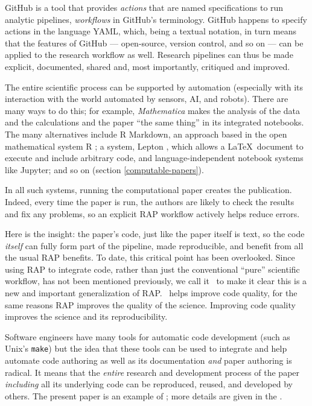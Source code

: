 \documentclass{comjnl}
\begin{document}
GitHub is a tool that provides \emph{actions\/} that are named specifications to run analytic pipelines, \emph{workflows\/} in GitHub's terminology. GitHub happens to specify actions in the language YAML, which, being a textual notation, in turn means that the features of GitHub --- open-source, version control, and so on --- can be applied to the research workflow as well. Research pipelines can thus be made explicit, documented, shared and, most importantly, critiqued and improved.

The entire scientific process can be supported by automation (especially with its interaction with the world automated by sensors, AI, and robots). There are many ways to do this; for example, \emph{Mathematica\/} makes the analysis of the data and the calculations and the paper ``the same thing'' in its integrated notebooks. The many alternatives include R Markdown, an approach based in the open mathematical system R \cite{RMarkdown}; a system, Lepton \cite{lepton}, which allows a \LaTeX\ document to execute and include arbitrary code, and language-independent notebook systems like Jupyter; and so on (section \ref{computable-papers}).  

In all such systems, running the computational paper creates the publication. Indeed, every time the paper is run, the authors are likely to check the results and fix any problems, so an explicit RAP workflow actively helps reduce errors. 

Here is the insight: the paper's code, just like the paper itself is text, so the code \emph{itself\/} can fully form part of the pipeline, made reproducible, and benefit from all the usual RAP benefits. To date, this critical point has been overlooked. Since using RAP to integrate code, rather than just the conventional ``pure'' scientific workflow, has not been mentioned previously, we call it \RAPstar\ to make it clear this is a new and important generalization of RAP\@. \RAPstar\ helps improve code quality, for the same reasons RAP improves the quality of the science. Improving code quality improves the science and its reproducibility. 

Software engineers have many tools for automatic code development (such as Unix's \texttt{make}) but the idea that these tools can be used to integrate and help automate code authoring as well as its documentation \emph{and\/} paper authoring is radical. It means that the \emph{entire\/} research and development process of the paper \emph{including\/} all its underlying code can be reproduced, reused, and developed by others. The present paper is an example of \RAPstarp; more details are given in the \supplement. 
\end{document}

